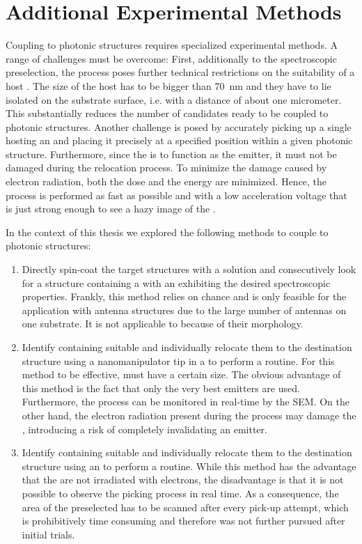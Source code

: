	\section{Additional Experimental Methods} \label{sec::methods_coupling}

	Coupling \sivs to photonic structures requires specialized experimental methods.
	A range of challenges must be overcome:
	First, additionally to the spectroscopic preselection, the \pp process poses further technical restrictions on the suitability of a host \nd.
	The size of the host \nd has to be bigger than \SI{70}{nm} and they have to lie isolated on the substrate surface, i.e. with a distance of about one micrometer.
	This substantially reduces the number of \siv candidates ready to be coupled to photonic structures.
	Another challenge is posed by accurately picking up a single \nd hosting an \siv and placing it precisely at a specified position within a given photonic structure.
	Furthermore, since the \siv is to function as the \pl emitter, it must not be damaged during the relocation process.
	To minimize the damage caused by electron radiation, both the dose and the energy are minimized.
	Hence, the \pp process is performed as fast as possible and with a low acceleration voltage that is just strong enough to see a hazy image of the \nd.


	In the context of this thesis we explored the following methods to couple \nds to photonic structures:

	\begin{enumerate}
		\item Directly spin-coat the target structures with a \nd solution and consecutively look for a structure containing a \nd with an \siv exhibiting the desired spectroscopic properties. Frankly, this method relies on chance and is only feasible for the application with antenna structures due to the large number of antennas on one substrate. It is not applicable to \VCSELs because of their morphology.

		\item Identify \nds containing suitable \sivs and individually relocate them to the destination structure using a nanomanipulator tip in a \sem to perform a \pp routine. For this method to be effective, \nds must have a certain size. The obvious advantage of this method is the fact that only the very best emitters are used. Furthermore, the \pp process can be monitored in real-time by the SEM. On the other hand, the electron radiation present during the \pp process may damage the \siv, introducing a risk of completely invalidating an emitter.

		\item Identify \nds containing suitable \sivs and individually relocate them to the destination structure using an \afm to perform a \pp routine. While this method has the advantage that the \nds are not irradiated with electrons, the disadvantage is that it is not possible to  observe the picking process in real time. As a consequence, the area of the preselected \nd has to be scanned after every pick-up attempt, which is prohibitively time consuming and therefore was not further pursued after initial trials.
	\end{enumerate}


